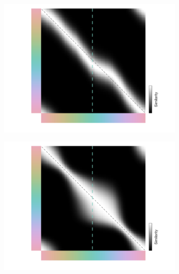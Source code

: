 \begin{figure}
    \begin{subfigure}[b]{0.3\textwidth}
         \centering
         \caption{}
         \includegraphics[width=\textwidth,trim={2cm 0.5cm 2 0},clip]{../Figures/working/F3_TCCModel/sm_og_231110-022722.png}
         \label{fig:TCCModel_og_sm}
    \end{subfigure}
    \begin{subfigure}[b]{0.3\textwidth}
         \centering
         \caption{}
         \includegraphics[width=\textwidth,trim={2cm 0.5cm 2 0},clip]{../Figures/working/F3_TCCModel/sm_ssnu_231110-022643.png}
         \label{fig:TCCModel_ssnu_sm}
    \end{subfigure}
    
    \begin{subfigure}[b]{0.3\textwidth}
         \centering
         \caption{}
         
         \label{fig:TCCModel_ssnu_sm}
    \end{subfigure}
    \begin{subfigure}[b]{0.3\textwidth}
         \centering
         \caption{}
         
         \label{fig:TCCModel_ssnu_sm}
    \end{subfigure}


\end{figure}
